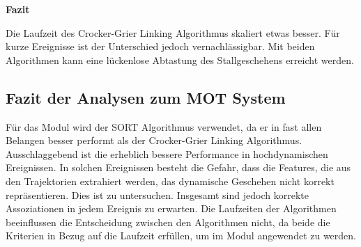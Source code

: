\textbf{Fazit}\par
Die Laufzeit des Crocker-Grier Linking Algorithmus skaliert etwas besser. Für kurze Ereignisse ist der Unterschied jedoch vernachlässigbar. Mit beiden Algorithmen kann eine lückenlose Abtastung des Stallgeschehens erreicht werden.

\subsection{Fazit der Analysen zum MOT System}
Für das Modul wird der SORT Algorithmus verwendet, da er in fast allen Belangen besser performt als der Crocker-Grier Linking Algorithmus. Ausschlaggebend ist die erheblich bessere Performance in hochdynamischen Ereignissen. In solchen Ereignissen besteht die Gefahr, dass die Features, die aus den Trajektorien extrahiert werden, das dynamische Geschehen nicht korrekt repräsentieren. Dies ist zu untersuchen. Insgesamt sind jedoch korrekte Assoziationen in jedem Ereignis zu erwarten. Die Laufzeiten der Algorithmen beeinflussen die Entscheidung zwischen den Algorithmen nicht, da beide die Kriterien in Bezug auf die Laufzeit erfüllen, um im Modul angewendet zu werden.